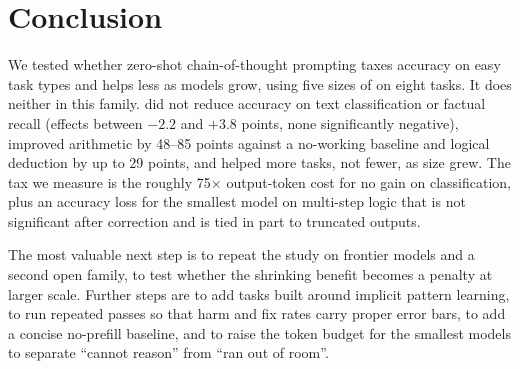 \section{Conclusion}
\label{sec:conclusion}

We tested whether zero-shot chain-of-thought prompting taxes accuracy on easy task types and helps less as models grow, using five sizes of \qwen on eight tasks.
It does neither in this family.
\CoT did not reduce accuracy on text classification or factual recall (effects between $-2.2$ and $+3.8$ points, none significantly negative), improved arithmetic by 48--85 points against a no-working baseline and logical deduction by up to 29 points, and helped more tasks, not fewer, as size grew.
The tax we measure is the roughly 75$\times$ output-token cost for no gain on classification, plus an accuracy loss for the smallest model on multi-step logic that is not significant after correction and is tied in part to truncated outputs.

The most valuable next step is to repeat the study on frontier models and a second open family, to test whether the shrinking \gsm benefit becomes a penalty at larger scale.
Further steps are to add tasks built around implicit pattern learning, to run repeated passes so that harm and fix rates carry proper error bars, to add a concise no-prefill baseline, and to raise the token budget for the smallest models to separate ``cannot reason'' from ``ran out of room''.
